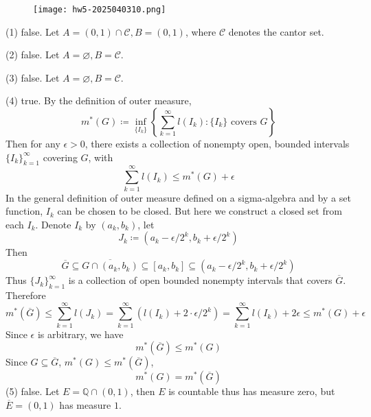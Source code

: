 \begin{figure}[H]
\centering
\texttt{[image: hw5-2025040310.png]}
\label{}
\end{figure}
(1) false. Let $A=(0,1)\cap \mathcal{C},B=(0,1)$, where $\mathcal{C}$ denotes the cantor set.

(2) false. Let $A=\varnothing,B=\mathcal{C}$.

(3) false. Let $A=\varnothing,B=\mathcal{C}$.

(4) true. By the definition of outer measure,
\[
m^{*}(G)\coloneqq \inf_{\{ I_k \}}\left\{  \sum_{k=1}^{\infty} l(I_k):\{ I_k \}\text{ covers }G  \right\}
\]
Then for any $\epsilon>0$, there exists a collection of nonempty open, bounded intervals $\{ I_k \}_{k=1}^{\infty}$ covering $G$, with
\[
\sum_{k=1}^{\infty} l(I_k)\leq m^{*}(G)+\epsilon
\]
In the general definition of outer measure defined on a sigma-algebra and by a set function, $I_k$ can be chosen to be closed. But here we construct a closed set from each $I_k$. Denote $I_k$ by $(a_k,b_k)$, let
\[
J_k\coloneqq (a_k-\epsilon/2^{k},b_k+\epsilon/2^{k})
\]
Then
\[
\overline{G}\subseteq  \overline{G\cap(a_k,b_k)}\subseteq[a_k,b_k]\subseteq (a_k-\epsilon/2^{k},b_k+\epsilon/2^{k})
\]
Thus $\{ J_k \}^{\infty}_{k=1}$ is a collection of open bounded nonempty intervals that covers $\overline{G}$. Therefore
\[
m^{*}(\overline{G})\leq \sum_{k=1}^{\infty}l(J_k)=\sum_{k=1}^{\infty} (l(I_k)+2\cdot\epsilon/2^{k}) =\sum_{k=1}^{\infty} l(I_k)+2\epsilon\leq m^{*}(G)+\epsilon
\]
Since $\epsilon$ is arbitrary, we have
\[
m^{*}(\overline{G})\leq m^{*}(G)
\]
Since $G\subseteq \overline{G}$, $m^{*}(G)\leq m^{*}(\overline{G})$,
\[
m^{*}(G)=m^{*}(\overline{G})
\]
(5) false. Let $E=\mathbb{Q}\cap(0,1)$, then $E$ is countable thus has measure zero, but $\overline{E}=(0,1)$ has measure $1$.

